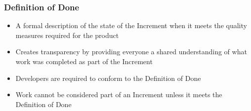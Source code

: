 \begin{frame}
	\frametitle{Definition of Done}
	\begin{itemize}
		\setlength\itemsep{0.7em}
		\item A formal description of the state of the Increment when it meets the quality measures required for the product
		\item Creates transparency by providing everyone a shared understanding of what work was completed as part of the Increment
		\item Developers are required to conform to the Definition of Done
		\item Work cannot be considered part of an Increment unless it meets the Definition of Done
	\end{itemize}
\end{frame}
